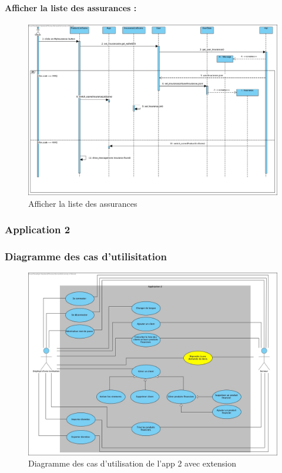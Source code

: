 \documentclass[../rapport.tex]{subfiles}
\begin{document}
				\paragraph{Afficher la liste des assurances :}
						\begin{figure}[h!]
								\centering\includegraphics[scale=0.3]{ressources/photos_diagrammes/extensionThomas/afficherListeAssurances.jpg}
								\caption{Afficher la liste des assurances}
						\end{figure}		
\newpage		
		\subsubsection{Application 2}

		\subsubsection{Diagramme des cas d'utilisitation}

				\begin{figure}[h]
						\center\includegraphics[scale=0.27]{ressources/photos_diagrammes/extensionThomas/useCase2Thomas.jpg}
						\caption{Diagramme des cas d'utilisation de l'app 2 avec extension}
				\end{figure}
\end{document}

